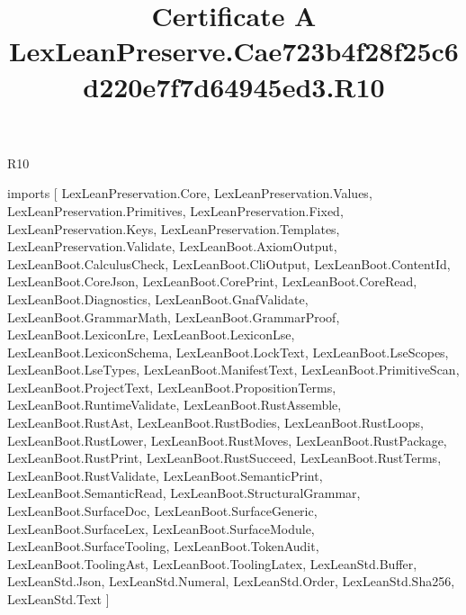 \begin{lexlean}{R10}
\title{Certificate A LexLeanPreserve.Cae723b4f28f25c6d220e7f7d64945ed3.R10}
\begin{coremodule}
imports [
  LexLeanPreservation.Core,
  LexLeanPreservation.Values,
  LexLeanPreservation.Primitives,
  LexLeanPreservation.Fixed,
  LexLeanPreservation.Keys,
  LexLeanPreservation.Templates,
  LexLeanPreservation.Validate,
  LexLeanBoot.AxiomOutput,
  LexLeanBoot.CalculusCheck,
  LexLeanBoot.CliOutput,
  LexLeanBoot.ContentId,
  LexLeanBoot.CoreJson,
  LexLeanBoot.CorePrint,
  LexLeanBoot.CoreRead,
  LexLeanBoot.Diagnostics,
  LexLeanBoot.GnafValidate,
  LexLeanBoot.GrammarMath,
  LexLeanBoot.GrammarProof,
  LexLeanBoot.LexiconLre,
  LexLeanBoot.LexiconLse,
  LexLeanBoot.LexiconSchema,
  LexLeanBoot.LockText,
  LexLeanBoot.LseScopes,
  LexLeanBoot.LseTypes,
  LexLeanBoot.ManifestText,
  LexLeanBoot.PrimitiveScan,
  LexLeanBoot.ProjectText,
  LexLeanBoot.PropositionTerms,
  LexLeanBoot.RuntimeValidate,
  LexLeanBoot.RustAssemble,
  LexLeanBoot.RustAst,
  LexLeanBoot.RustBodies,
  LexLeanBoot.RustLoops,
  LexLeanBoot.RustLower,
  LexLeanBoot.RustMoves,
  LexLeanBoot.RustPackage,
  LexLeanBoot.RustPrint,
  LexLeanBoot.RustSucceed,
  LexLeanBoot.RustTerms,
  LexLeanBoot.RustValidate,
  LexLeanBoot.SemanticPrint,
  LexLeanBoot.SemanticRead,
  LexLeanBoot.StructuralGrammar,
  LexLeanBoot.SurfaceDoc,
  LexLeanBoot.SurfaceGeneric,
  LexLeanBoot.SurfaceLex,
  LexLeanBoot.SurfaceModule,
  LexLeanBoot.SurfaceTooling,
  LexLeanBoot.TokenAudit,
  LexLeanBoot.ToolingAst,
  LexLeanBoot.ToolingLatex,
  LexLeanStd.Buffer,
  LexLeanStd.Json,
  LexLeanStd.Numeral,
  LexLeanStd.Order,
  LexLeanStd.Sha256,
  LexLeanStd.Text
]


\end{coremodule}
\end{lexlean}
